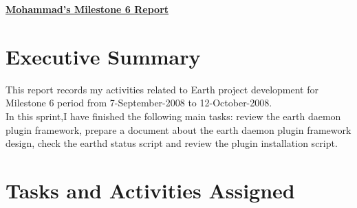 \pagestyle{headings}

\begin{center}
{\large\textbf{\underline{{Mohammad's Milestone 6 Report}}}}
\end{center}

\section*{Executive Summary}
This report records my activities related to Earth project development for Milestone 6 period from 7-September-2008 to 12-October-2008.\\
In this sprint,I have finished the following main tasks: review the earth daemon plugin framework, prepare a document about the earth daemon plugin framework design, check the earthd status script and review the plugin installation script.      

\section*{Tasks and Activities Assigned}

